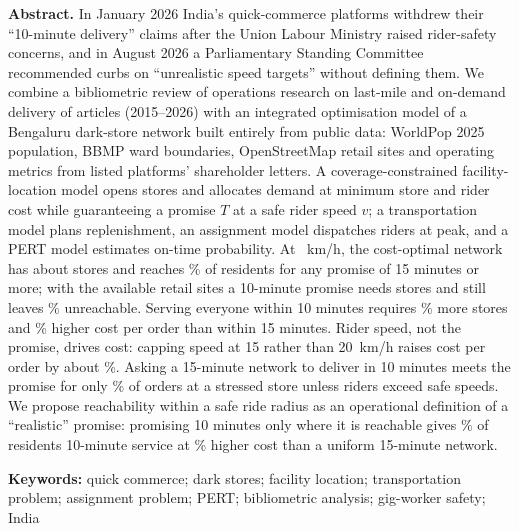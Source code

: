 \begin{center}\begin{minipage}{0.88\textwidth}\small\noindent\textbf{Abstract.} 
In January 2026 India's quick-commerce platforms withdrew their ``10-minute delivery'' claims after the Union Labour Ministry raised rider-safety concerns, and in August 2026 a Parliamentary Standing Committee recommended curbs on ``unrealistic speed targets'' without defining them. We combine a bibliometric review of operations research on last-mile and on-demand delivery of \BibIncluded{} articles (2015--2026) with an integrated optimisation model of a Bengaluru dark-store network built entirely from public data: WorldPop 2025 population, BBMP ward boundaries, OpenStreetMap retail sites and operating metrics from listed platforms' shareholder letters. A coverage-constrained facility-location model opens stores and allocates demand at minimum store and rider cost while guaranteeing a promise $T$ at a safe rider speed $v$; a transportation model plans replenishment, an assignment model dispatches riders at peak, and a PERT model estimates on-time probability. At \BaseV~km/h, the cost-optimal network has about \StoresTFifteen{} stores and reaches \ServedFifteenPct\% of residents for any promise of 15 minutes or more; with the available retail sites a 10-minute promise needs \StoresTTen{} stores and still leaves \UnreachTenPct\% unreachable. Serving everyone within 10 minutes requires \GridStorePremiumPct\% more stores and \GridCostPremiumPct\% higher cost per order than within 15 minutes. Rider speed, not the promise, drives cost: capping speed at 15 rather than 20~km/h raises cost per order by about \SpeedCapPremiumPct\%. Asking a 15-minute network to deliver in 10 minutes meets the promise for only \AssignStressTenOnTime\% of orders at a stressed store unless riders exceed safe speeds. We propose reachability within a safe ride radius as an operational definition of a ``realistic'' promise: promising 10 minutes only where it is reachable gives \MixedTenShare\% of residents 10-minute service at \MixedPremiumPct\% higher cost than a uniform 15-minute network.

\medskip\noindent\textbf{Keywords:} quick commerce; dark stores; facility location; transportation problem; assignment problem; PERT; bibliometric analysis; gig-worker safety; India
\end{minipage}\end{center}
